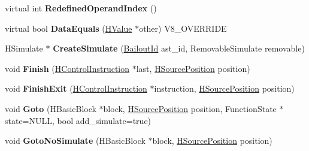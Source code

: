 \begin{DoxyCompactItemize}
\item 
\hypertarget{classv8_1_1internal_1_1_v8___f_i_n_a_l_ae8dec44d4438a5c5137ae8c23a80aa91}{}virtual int {\bfseries Redefined\+Operand\+Index} ()\label{classv8_1_1internal_1_1_v8___f_i_n_a_l_ae8dec44d4438a5c5137ae8c23a80aa91}

\item 
\hypertarget{classv8_1_1internal_1_1_v8___f_i_n_a_l_a7f4d45af1c12067191189fb1f32db617}{}virtual bool {\bfseries Data\+Equals} (\hyperlink{classv8_1_1internal_1_1_h_value}{H\+Value} $\ast$other) V8\+\_\+\+O\+V\+E\+R\+R\+I\+D\+E\label{classv8_1_1internal_1_1_v8___f_i_n_a_l_a7f4d45af1c12067191189fb1f32db617}

\item 
\hypertarget{classv8_1_1internal_1_1_v8___f_i_n_a_l_ae0036f97a77029ced90dceb45e20502a}{}H\+Simulate $\ast$ {\bfseries Create\+Simulate} (\hyperlink{classv8_1_1internal_1_1_bailout_id}{Bailout\+Id} ast\+\_\+id, Removable\+Simulate removable)\label{classv8_1_1internal_1_1_v8___f_i_n_a_l_ae0036f97a77029ced90dceb45e20502a}

\item 
\hypertarget{classv8_1_1internal_1_1_v8___f_i_n_a_l_a403c2547e622f35daa280ecc37cff9e0}{}void {\bfseries Finish} (\hyperlink{classv8_1_1internal_1_1_h_control_instruction}{H\+Control\+Instruction} $\ast$last, \hyperlink{classv8_1_1internal_1_1_h_source_position}{H\+Source\+Position} position)\label{classv8_1_1internal_1_1_v8___f_i_n_a_l_a403c2547e622f35daa280ecc37cff9e0}

\item 
\hypertarget{classv8_1_1internal_1_1_v8___f_i_n_a_l_aa89e7ad067ef61fec511d6a616d444cc}{}void {\bfseries Finish\+Exit} (\hyperlink{classv8_1_1internal_1_1_h_control_instruction}{H\+Control\+Instruction} $\ast$instruction, \hyperlink{classv8_1_1internal_1_1_h_source_position}{H\+Source\+Position} position)\label{classv8_1_1internal_1_1_v8___f_i_n_a_l_aa89e7ad067ef61fec511d6a616d444cc}

\item 
\hypertarget{classv8_1_1internal_1_1_v8___f_i_n_a_l_a754c9512090a55000a01cf1f933c8123}{}void {\bfseries Goto} (H\+Basic\+Block $\ast$block, \hyperlink{classv8_1_1internal_1_1_h_source_position}{H\+Source\+Position} position, Function\+State $\ast$state=N\+U\+L\+L, bool add\+\_\+simulate=true)\label{classv8_1_1internal_1_1_v8___f_i_n_a_l_a754c9512090a55000a01cf1f933c8123}

\item 
\hypertarget{classv8_1_1internal_1_1_v8___f_i_n_a_l_a78847655763452a6b76295c7d9ec1fd1}{}void {\bfseries Goto\+No\+Simulate} (H\+Basic\+Block $\ast$block, \hyperlink{classv8_1_1internal_1_1_h_source_position}{H\+Source\+Position} position)\label{classv8_1_1internal_1_1_v8___f_i_n_a_l_a78847655763452a6b76295c7d9ec1fd1}


\end{DoxyCompactItemize}
